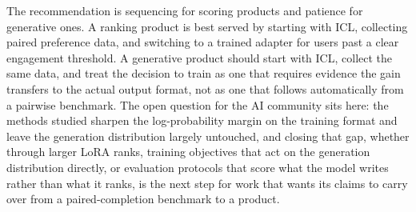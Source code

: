 The recommendation is sequencing for scoring products and patience for generative ones. A ranking product is best served by starting with ICL, collecting paired preference data, and switching to a trained adapter for users past a clear engagement threshold. A generative product should start with ICL, collect the same data, and treat the decision to train as one that requires evidence the gain transfers to the actual output format, not as one that follows automatically from a pairwise benchmark. The open question for the AI community sits here: the methods studied sharpen the log-probability margin on the training format and leave the generation distribution largely untouched, and closing that gap, whether through larger LoRA ranks, training objectives that act on the generation distribution directly, or evaluation protocols that score what the model writes rather than what it ranks, is the next step for work that wants its claims to carry over from a paired-completion benchmark to a product.